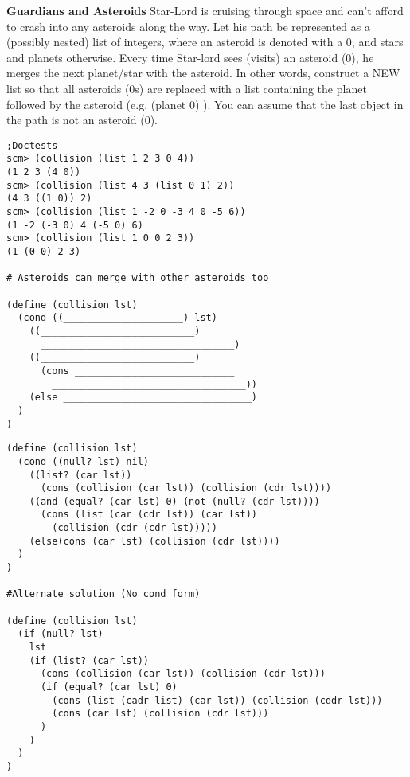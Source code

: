 \begin{blocksection}
\question
\textbf{Guardians and Asteroids}
Star-Lord is cruising through space and can’t afford to crash into any asteroids along the way. Let his path be represented as a (possibly nested) list of integers, where an asteroid is denoted with a 0, and stars and planets otherwise. Every time Star-lord sees (visits) an asteroid (0), he merges the next planet/star with the asteroid. In other words, construct a NEW list so that all asteroids (0s) are replaced with a list containing the planet followed by the asteroid (e.g. (planet 0) ). You can assume that the last object in the path is not an asteroid (0).
\\
\begin{lstlisting}
;Doctests
scm> (collision (list 1 2 3 0 4))
(1 2 3 (4 0))
scm> (collision (list 4 3 (list 0 1) 2))
(4 3 ((1 0)) 2)
scm> (collision (list 1 -2 0 -3 4 0 -5 6))
(1 -2 (-3 0) 4 (-5 0) 6)
scm> (collision (list 1 0 0 2 3))
(1 (0 0) 2 3) 

# Asteroids can merge with other asteroids too

(define (collision lst)
  (cond ((_____________________) lst)
    ((___________________________)
      __________________________________)
    ((___________________________)
      (cons ____________________________
        __________________________________))
    (else _________________________________)
  )
)

\end{lstlisting}
\end{blocksection}

\begin{solution}
\begin{blocksection}
\begin{lstlisting}
(define (collision lst)
  (cond ((null? lst) nil)
    ((list? (car lst))
      (cons (collision (car lst)) (collision (cdr lst))))
    ((and (equal? (car lst) 0) (not (null? (cdr lst))))
      (cons (list (car (cdr lst)) (car lst))
        (collision (cdr (cdr lst)))))
    (else(cons (car lst) (collision (cdr lst))))
  )
)

#Alternate solution (No cond form)

(define (collision lst)
  (if (null? lst)
    lst
    (if (list? (car lst))
      (cons (collision (car lst)) (collision (cdr lst)))
      (if (equal? (car lst) 0)
        (cons (list (cadr list) (car lst)) (collision (cddr lst)))
        (cons (car lst) (collision (cdr lst)))
      )
    )
  )
)
\end{lstlisting}
\end{blocksection}
\end{solution}